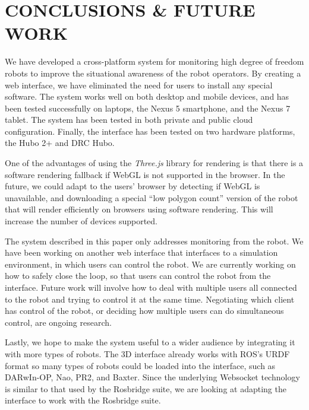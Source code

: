 \documentclass[letterpaper, 10 pt, conference]{ieee/ieeeconf}  %
\begin{document}
\section{CONCLUSIONS \& FUTURE WORK}
We have developed a cross-platform system for monitoring high degree of freedom robots to improve the situational awareness of the robot operators.
By creating a web interface, we have eliminated the need for users to install any special software.
The system works well on both desktop and mobile devices, and has been tested successfully on laptops, the Nexus 5 smartphone, and the Nexus 7 tablet.
The system has been tested in both private and public cloud configuration.
Finally, the interface has been tested on two hardware platforms, the Hubo 2+ and DRC Hubo.

One of the advantages of using the \textit{Three.js} library for rendering is that there is a software rendering fallback if WebGL is not supported in the browser.
In the future, we could adapt to the users' browser by detecting if WebGL is unavailable, and downloading a special ``low polygon count'' version of the robot that will render efficiently on browsers using software rendering.
This will increase the number of devices supported.

The system described in this paper only addresses monitoring from the robot.
We have been working on another web interface that interfaces to a simulation environment, in which users can control the robot.
We are currently working on how to safely close the loop, so that users can control the robot from the interface.
Future work will involve how to deal with multiple users all connected to the robot and trying to control it at the same time.
Negotiating which client has control of the robot, or deciding how multiple users can do simultaneous control, are ongoing research.

Lastly, we hope to make the system useful to a wider audience by integrating it with more types of robots.
The 3D interface already works with ROS's URDF format so many types of robots could be loaded into the interface, such as DARwIn-OP, Nao, PR2, and Baxter.
Since the underlying Websocket technology is similar to that used by the Rosbridge suite, we are looking at adapting the interface to work with the Rosbridge suite.




\end{document}
